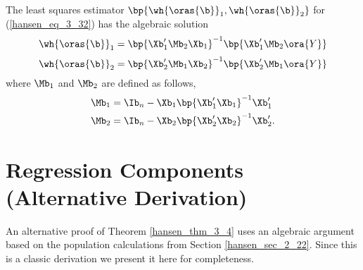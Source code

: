 \begin{theorem}{} 
    \label{hansen_thm_3_4}
    The least squares estimator $\bp{\wh{\oras{\b}}_1, \wh{\oras{\b}}_2}$ for (\ref{hansen_eq_3_32}) has the algebraic solution
    \begin{equation}
        \label{hansen_eq_3_37}
        \wh{\oras{\b}}_1 = \bp{\Xb_1^\prime \Mb_2 \Xb_1}^{-1}  \bp{\Xb_1^\prime \Mb_2 \ora{Y}}
    \end{equation}
    \begin{equation}
        \label{hansen_eq_3_38}
        \wh{\oras{\b}}_2 = \bp{\Xb_2^\prime \Mb_1 \Xb_2}^{-1}  \bp{\Xb_2^\prime \Mb_1 \ora{Y}}
    \end{equation}
    where $\Mb_1$ and $\Mb_2$ are defined as follows,
    \begin{equation}
        \notag 
        \begin{aligned}
            & \Mb_1 = \Ib_n - \Xb_1 \bp{\Xb_1^\prime \Xb_1}^{-1} \Xb_1^\prime \\
            & \Mb_2 = \Ib_n - \Xb_2 \bp{\Xb_2^\prime \Xb_2}^{-1} \Xb_2^\prime.
        \end{aligned}
    \end{equation}
\end{theorem}

\section{Regression Components (Alternative Derivation)}

An alternative proof of Theorem \ref{hansen_thm_3_4} uses an algebraic argument based on the population calculations from Section \ref{hansen_sec_2_22}. Since this is a classic derivation we present it here for completeness.

